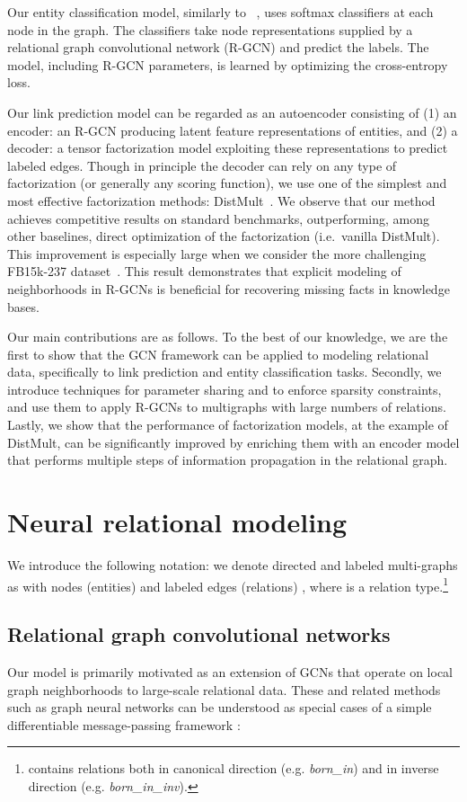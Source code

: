 \documentclass[letterpaper]{article} \usepackage{aaai18}  \usepackage{times}  \usepackage{helvet}  \usepackage{courier}  \usepackage{url}  \usepackage{graphicx}  \frenchspacing
\newcommand{\citet}[1]{\citeauthor{#1}~\shortcite{#1}}
\begin{document}
Our entity classification model, similarly to \citet{kipf2016semi}, uses softmax classifiers at each node in the graph. The classifiers take node representations supplied by a relational graph convolutional network (R-GCN) and predict the labels. The model, including R-GCN parameters, is learned by optimizing the cross-entropy loss.

Our link prediction model can be regarded as an autoencoder consisting of (1) an encoder: an R-GCN producing latent feature representations of entities, and (2) a decoder: a tensor factorization model exploiting these representations to predict labeled edges. Though in principle the decoder can rely on any type of factorization (or generally any scoring function), we use one of the simplest and most effective factorization methods: DistMult~\cite{distmult-embedding_entities_and_relations}. We observe that our method achieves competitive results on standard benchmarks, outperforming, among other baselines, direct optimization of the factorization (i.e.~vanilla DistMult).  This improvement is especially large when we consider the more challenging FB15k-237 dataset~\cite{toutanova2015observed}. This result demonstrates that explicit modeling of neighborhoods in R-GCNs is beneficial for recovering missing facts in knowledge bases.

Our main contributions are as follows. To the best of our knowledge, we are the first to show that the GCN framework can be applied to modeling relational data, specifically to link prediction and entity classification tasks. Secondly, we introduce techniques for parameter sharing and to enforce sparsity constraints, and use them to apply R-GCNs to multigraphs with large numbers of relations. Lastly, we show that the performance of factorization models, at the example of DistMult, can be significantly improved by enriching them with an encoder model that performs multiple steps of information propagation in the relational graph.
 
\section{Neural relational modeling}
We introduce the following notation: we denote directed and labeled multi-graphs as  with nodes (entities)  and labeled edges (relations) , where  is a relation type.\footnote{ contains relations both in canonical direction (e.g. \textit{born\_in}) and in inverse direction (e.g. \textit{born\_in\_inv}).}

\subsection{Relational graph convolutional networks}
Our model is primarily motivated as an extension of GCNs that operate on local graph neighborhoods \cite{duvenaud2015convolutional,kipf2016semi} to large-scale relational data. These and related methods such as graph neural networks \cite{scarselli2009graph} can be understood as special cases of a simple differentiable message-passing framework \cite{gilmer2017neural}:
\end{document}
